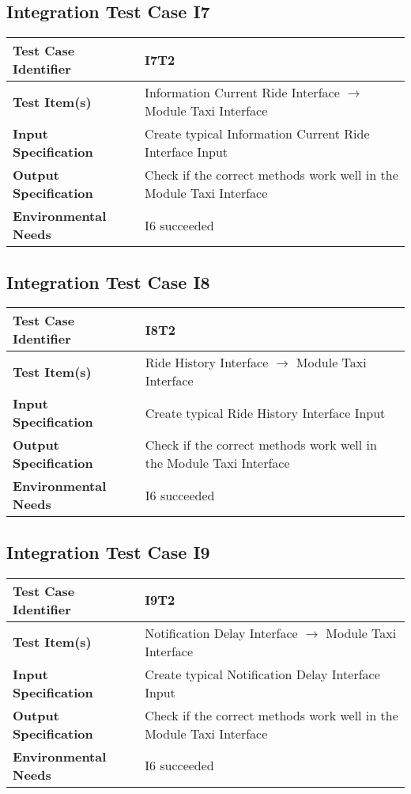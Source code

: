 \subsection{Integration Test Case I7}
\begin{tabular}{l p{9cm}}
	\hline
	\textbf{Test	Case Identifier} & I7T2 \\ \hline
	\textbf{Test	Item(s)} & Information Current Ride Interface $\rightarrow$ Module Taxi Interface \\ \hline
	\textbf{Input Specification} & Create typical Information Current Ride Interface Input\\ \hline
	\textbf{Output Specification} & Check if the correct methods work well in the Module Taxi Interface \\ \hline
	\textbf{Environmental Needs} & I6 succeeded \\ \hline
\end{tabular}
\subsection{Integration Test Case I8}
\begin{tabular}{l p{9cm}}
	\hline
	\textbf{Test	Case Identifier} & I8T2 \\ \hline
	\textbf{Test	Item(s)} & Ride History Interface $\rightarrow$ Module Taxi Interface \\ \hline
	\textbf{Input Specification} & Create typical Ride History Interface Input\\ \hline
	\textbf{Output Specification} & Check if the correct methods work well in the Module Taxi Interface \\ \hline
	\textbf{Environmental Needs} & I6 succeeded \\ \hline
\end{tabular}
\subsection{Integration Test Case I9}
\begin{tabular}{l p{9cm}}
	\hline
	\textbf{Test	Case Identifier} & I9T2 \\ \hline
	\textbf{Test	Item(s)} & Notification Delay Interface $\rightarrow$ Module Taxi Interface \\ \hline
	\textbf{Input Specification} & Create typical Notification Delay Interface Input\\ \hline
	\textbf{Output Specification} & Check if the correct methods work well in the Module Taxi Interface \\ \hline
	\textbf{Environmental Needs} & I6 succeeded \\ \hline
\end{tabular}
